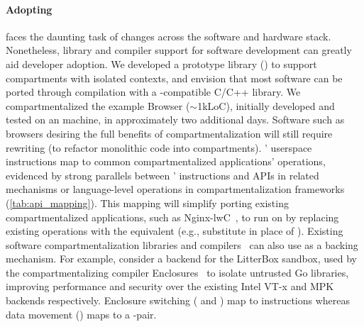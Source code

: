 \paragraph{Adopting \seccells}
\seccells faces the daunting task of changes across the software and 
hardware stack.
Nonetheless, library and compiler support for software development
can greatly aid developer adoption.
We developed a prototype library
()
to support compartments with isolated contexts, and envision that
most software can be ported through compilation with a
\seccells-compatible C/C++ library.
We compartmentalized the example Browser ($\sim$1kLoC), 
initially developed and tested on an  machine, 
in approximately two additional days.
Software such as browsers desiring the full benefits of compartmentalization
will still require rewriting (to refactor monolithic code into compartments).
\seccells' userspace instructions map to common compartmentalized
applications' operations, evidenced by strong parallels between
\seccells' instructions and APIs in related mechanisms or 
language-level operations in compartmentalization
frameworks (\autoref{tab:api_mapping}).
This mapping will simplify porting existing compartmentalized
applications, such as Nginx-lwC~\cite{LittonVE0BD16}, to run on \seccells
by replacing existing operations with the \seccells equivalent 
(e.g., substitute \sdswitch in place of ).
Existing software compartmentalization libraries and compilers~\cite{HsuHEP16}
can also use \seccells as a backing mechanism.
%
For example, consider a \seccells backend for the LitterBox sandbox,
used by the compartmentalizing compiler Enclosures~\cite{GhosnKPLB21}
to isolate untrusted Go libraries, improving performance and security over
the existing Intel VT-x and MPK backends respectively.
Enclosure switching ( and ) map to \sdswitch
instructions whereas data movement () maps to a 
\sctfer-\screcv pair.

